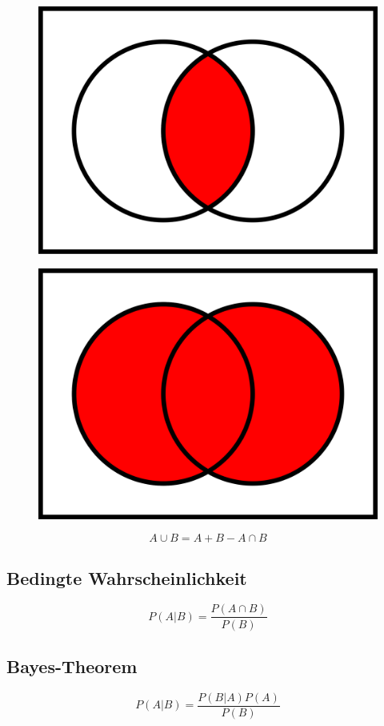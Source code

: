 \begin{figure}[ht]
    \centering
    \begin{minipage}{.5\textwidth}
      \centering
      \includegraphics[width=.4\linewidth]{mehrdimWktrechnung/Venn0001.svg.png}
      \label{fig:schnittmenge}
    \end{minipage}%
    \begin{minipage}{.5\textwidth}
      \centering
      \includegraphics[width=.4\linewidth]{mehrdimWktrechnung/Venn0111.svg.png}
      \label{fig:vereinigungsmenge}
    \end{minipage}
\end{figure}

\begin{equation*}
    A\cup B = A+B-A\cap B
\end{equation*}


\subsection{Bedingte Wahrscheinlichkeit}

\begin{equation*}
    P(A|B)=\frac{P(A\cap B)}{P(B)}
\end{equation*}

\subsection{Bayes-Theorem}

\begin{equation*}
    P(A|B)=\frac{P(B|A)P(A)}{P(B)}
\end{equation*}
